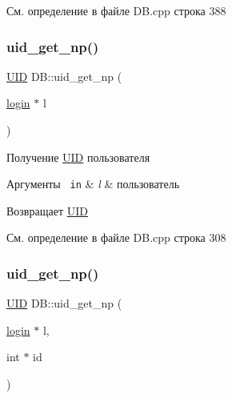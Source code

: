 См. определение в файле D\+B.\+cpp строка 388

\mbox{\label{group__dbcpp_ga5acc70d365de65365c861533a2b755c3}} 
\subsubsection{\texorpdfstring{uid\_get\_np()}{uid\_get\_np()}\hspace{0.1cm}{\footnotesize\ttfamily [1/2]}}
{\footnotesize\ttfamily \mbox{\hyperlink{struct_u_i_d}{U\+ID}} D\+B\+::uid\+\_\+get\+\_\+np (\begin{DoxyParamCaption}\item[{\mbox{\hyperlink{structlogin}{login}} $\ast$}]{l }\end{DoxyParamCaption})}



Получение \mbox{\hyperlink{struct_u_i_d}{U\+ID}} пользователя 


\begin{DoxyParams}[1]{Аргументы}
\mbox{\texttt{ in}}  & {\em l} & пользователь \\
\hline
\end{DoxyParams}
\begin{DoxyReturn}{Возвращает}
\mbox{\hyperlink{struct_u_i_d}{U\+ID}} 
\end{DoxyReturn}


См. определение в файле D\+B.\+cpp строка 308

\mbox{\label{group__dbcpp_ga9c55abcaab4db2b421bf72c968a818a4}} 
\subsubsection{\texorpdfstring{uid\_get\_np()}{uid\_get\_np()}\hspace{0.1cm}{\footnotesize\ttfamily [2/2]}}
{\footnotesize\ttfamily \mbox{\hyperlink{struct_u_i_d}{U\+ID}} D\+B\+::uid\+\_\+get\+\_\+np (\begin{DoxyParamCaption}\item[{\mbox{\hyperlink{structlogin}{login}} $\ast$}]{l,  }\item[{int $\ast$}]{id }\end{DoxyParamCaption})}



